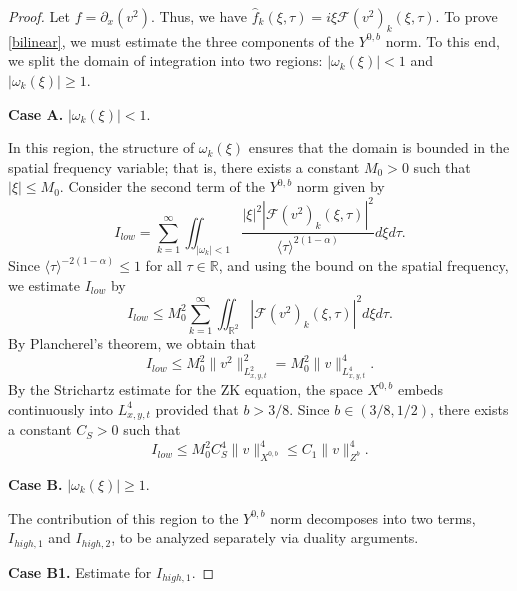 \documentclass[10pt,a4paper]{amsart}
\begin{document}
\begin{proof}
Let $f = \partial_{x}(v^2)$. Thus, we have $\widehat{f}_{k}(\xi,\tau) = i\xi \mathcal{F}(v^{2})_{k}(\xi,\tau)$. To prove \eqref{bilinear}, we must estimate the three components of the $Y^{0,b}$ norm. To this end, we split the domain of integration into two regions: $|\omega_{k}(\xi)| < 1$ and $|\omega_{k}(\xi)| \ge 1$.

\textbf{Case A.} $|\omega_{k}(\xi)| < 1$.

In this region, the structure of $\omega_{k}(\xi)$ ensures that the
domain is bounded in the spatial frequency variable; that is, there
exists a constant $M_0 > 0$ such that $|\xi| \le M_0$. Consider the
second term of the $Y^{0,b}$ norm given by
\begin{equation}I_{low} = \sum_{k=1}^{\infty} \iint_{|\omega_{k}| < 1} \frac{|\xi|^{2} |\mathcal{F}(v^{2})_{k}(\xi,\tau)|^{2}}{\langle \tau \rangle^{2(1-\alpha)}} d\xi d\tau.\end{equation}
Since $\langle \tau \rangle^{-2(1-\alpha)} \le 1$ for all $\tau \in
\mathbb{R}$, and using the bound on the spatial frequency, we
estimate $I_{low}$ by
\begin{equation}
    I_{low} \le M_0^2 \sum_{k=1}^{\infty} \iint_{\mathbb{R}^2} |\mathcal{F}(v^2)_k(\xi,\tau)|^2 d\xi d\tau.
\end{equation}
By Plancherel's theorem, we obtain that
\begin{equation}
    I_{low} \le M_{0}^{2} \|v^{2}\|_{L^{2}_{x,y,t}}^{2} = M_{0}^{2} \|v\|_{L^{4}_{x,y,t}}^{4}.
\end{equation}
By the Strichartz estimate for the ZK equation, the space $X^{0,b}$
embeds continuously into $L^{4}_{x,y,t}$ provided that $b > 3/8$.
Since $b \in (3/8, 1/2)$, there exists a constant $C_{S} > 0$ such
that
\begin{equation}
    I_{low} \le M_{0}^{2} C_{S}^{4} \|v\|_{X^{0,b}}^{4} \le C_{1} \|v\|_{Z^{b}}^{4}.
\end{equation}

\textbf{Case B.} $|\omega_{k}(\xi)| \ge 1$.

The contribution of this region to the $Y^{0,b}$ norm decomposes
into two terms, $I_{high,1}$ and $I_{high,2}$, to be analyzed
separately via duality arguments.

\textbf{Case B1.} Estimate for $I_{high,1}$.


\end{proof}
\end{document}
